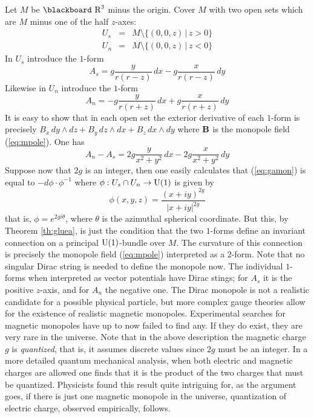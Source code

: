 \documentclass[12pt,titlepage]{article}
\def\bbf#1{\hbox{\blackboard #1}}
\def\lR{\bbf R}
\def\U{\hbox{U}}
\begin{document}
Let \(M\) be \(\lR^3\) minus the origin. Cover \(M\) with two open sets
 which are \(M\) minus one of the half \(z\)-axes:
\begin{eqnarray*}
U_s &=& M \setminus \{(0,0,z)\,|\,z > 0\} \\
U_n &=& M \setminus \{(0,0,z)\,|\,z < 0\} 
\end{eqnarray*}%
In \(U_s\) introduce the \(1\)-form 
\[
A_s = g\frac{y}{r(r-z)}\,dx -g\frac{x}{r(r-z)}\, dy
\]
 Likewise in 
\(U_n\) introduce the \(1\)-form
\[
A_n = -g\frac{y}{r(r+z)}\, dx +g\frac{x}{r(r+z)}\, dy 
\]
 It is easy to
show that in each open set the exterior derivative of each \(1\)-form 
is precisely \(B_x\, dy\wedge dz +B_y\, dz\wedge dx+B_z\, dx\wedge dy\)
where \({\bf B}\) is the monopole field 
(\ref{eq:mpole}). One has
\begin{equation}\label{eq:gamon}%
A_n-A_s=2g\frac{y}{x^2+y^2}\, dx-2g\frac{x}{x^2+y^2}\,dy
\end{equation}%
Suppose now that \(2g\) is an integer, then one easily calculates that
(\ref{eq:gamon}) is
 equal to \(-d\phi\cdot \phi^{-1}\) where \(\phi:U_s\cap U_n \to
\U(1)\) is given by 
\[
\phi(x,y, z) = \frac{(x+iy)^{2g}}{|x+iy|^{2g}}
\] 
that is, \(\phi=e^{2gi\theta}\), where \(\theta\) is the 
azimuthal spherical
coordinate.
But this, by Theorem
\ref{th:gluea}, is just the condition that the two  \(1\)-forms 
define an invariant connection on a
principal \(\U(1)\)-bundle over \(M\). The curvature of this connection
is precisely the monopole field (\ref{eq:mpole}) interpreted as a 
\(2\)-form. Note that no singular Dirac string is needed to define the
monopole now. The individual \(1\)-forms when interpreted as vector
potentials have Dirac stings; for \(A_s\) it is the positive \(z\)-axis,
and for \(A_n\) the negative one.
The Dirac monopole is not a realistic candidate for a possible physical
particle,  but
more complex gauge theories allow for the existence of realistic
magnetic monopoles. Experimental searches for magnetic monopoles have up
to now failed to find any. If they do exist, they are very rare in the
universe. Note that in the above description the magnetic charge \(g\)
is {\em quantized\/}, that is, it assumes discrete values since \(2g\)
must be an integer. In a more detailed quantum mechanical analysis, when
both electric and magnetic charges are allowed one finds that it is the
product of the two charges that must be quantized. Physicists
found this result quite intriguing for, as the argument goes, 
if there is just one magnetic monopole in the universe, quantization of
electric charge, observed empirically, follows.
\end{document}

